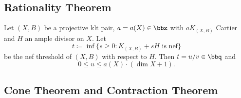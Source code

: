 \subsection{Rationality Theorem}

    \begin{theorem}\label{thm: rationality theorem}
        Let \((X,B)\) be a projective klt pair, \(a = a(X) \in \bbz\) with \(aK_{(X,B)}\) Cartier and \(H\) an ample divisor on \(X\).
        Let 
        \[ t \coloneqq \inf \{s \geq 0: K_{(X,B)} + sH \text{ is nef}\} \]
        be the nef threshold of \((X,B)\) with respect to \(H\).
        Then \(t = u/v \in \bbq\) and 
        \[ 0 \leq u \leq a(X)\cdot (\dim X + 1). \]
    \end{theorem}


\subsection{Cone Theorem and Contraction Theorem}

